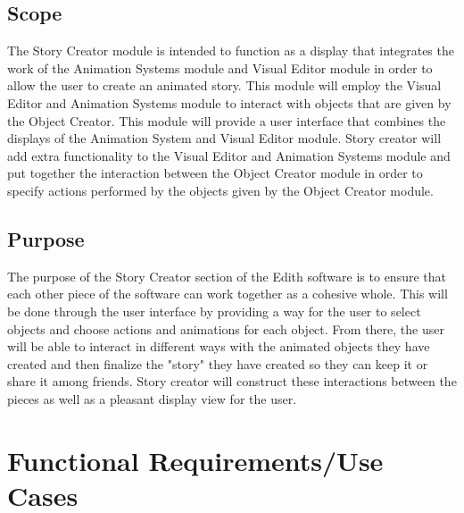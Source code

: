 \documentclass[12pt]{article}
\begin{document}
	\subsection{Scope}
	The Story Creator module is intended to function as a display that integrates the work of the Animation Systems module and Visual Editor module in order to allow the user to create an animated story.  This module will employ the Visual Editor and Animation Systems module to interact with objects that are given by the Object Creator.  This module will provide a user interface that combines the displays of the Animation System and Visual Editor module.  Story creator will add extra functionality to the Visual Editor and Animation Systems module and put together the interaction between the Object Creator module in order to specify actions performed by the objects given by the Object Creator module.\
	\subsection{Purpose}
	The purpose of the Story Creator section of the Edith software is to ensure that each other piece of the software can work together as a cohesive whole. This will be done through the user interface by providing a way for the user to select objects and choose actions and animations for each object. From there, the user will be able to interact in different ways with the animated objects they have created and then finalize the "story" they have created so they can keep it or share it among friends. Story creator will construct these interactions between the pieces as well as a pleasant display view for the user.
	
	
\section{Functional Requirements/Use Cases}
\end{document}

